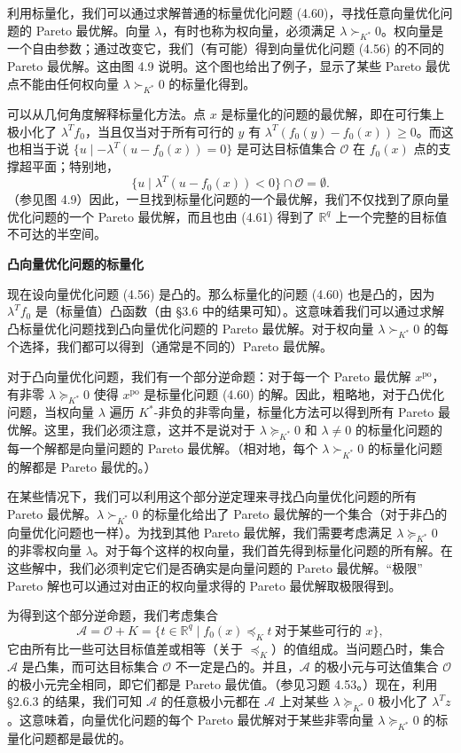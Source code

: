 \documentclass[UTF8,12pt,a4paper,fontset=fandol]{ctexart}
\begin{document}
利用标量化，我们可以通过求解普通的标量优化问题 (4.60)，寻找任意向量优化问题的 Pareto 最优解。向量 $\lambda$，有时也称为权向量，必须满足 $\lambda\succ_{K^\ast}0$。权向量是一个自由参数；通过改变它，我们（有可能）得到向量优化问题 (4.56) 的不同的 Pareto 最优解。这由图 4.9 说明。这个图也给出了例子，显示了某些 Pareto 最优点不能由任何权向量 $\lambda\succ_{K^\ast}0$ 的标量化得到。

可以从几何角度解释标量化方法。点 $x$ 是标量化的问题的最优解，即在可行集上极小化了 $\lambda^Tf_0$，当且仅当对于所有可行的 $y$ 有 $\lambda^T(f_0(y)-f_0(x))\geq 0$。而这也相当于说 $\{u\mid -\lambda^T(u-f_0(x))=0\}$ 是可达目标值集合 $\mathcal{O}$ 在 $f_0(x)$ 点的支撑超平面；特别地，
\begin{equation}
\{u\mid \lambda^T(u-f_0(x))<0\}\cap\mathcal{O}=\emptyset.
\tag{4.61}
\end{equation}
（参见图 4.9）因此，一旦找到标量化问题的一个最优解，我们不仅找到了原向量优化问题的一个 Pareto 最优解，而且也由 (4.61) 得到了 $\mathbb{R}^q$ 上一个完整的目标值不可达的半空间。

\noindent\textbf{凸向量优化问题的标量化}

现在设向量优化问题 (4.56) 是凸的。那么标量化的问题 (4.60) 也是凸的，因为 $\lambda^Tf_0$ 是（标量值）凸函数（由 \S 3.6 中的结果可知）。这意味着我们可以通过求解凸标量优化问题找到凸向量优化问题的 Pareto 最优解。对于权向量 $\lambda\succ_{K^\ast}0$ 的每个选择，我们都可以得到（通常是不同的）Pareto 最优解。

对于凸向量优化问题，我们有一个部分逆命题：对于每一个 Pareto 最优解 $x^{\mathrm{po}}$，有非零 $\lambda\succeq_{K^\ast}0$ 使得 $x^{\mathrm{po}}$ 是标量化问题 (4.60) 的解。因此，粗略地，对于凸优化问题，当权向量 $\lambda$ 遍历 $K^\ast$-非负的非零向量，标量化方法可以得到所有 Pareto 最优解。这里，我们必须注意，这并不是说对于 $\lambda\succeq_{K^\ast}0$ 和 $\lambda\neq 0$ 的标量化问题的每一个解都是向量问题的 Pareto 最优解。（相对地，每个 $\lambda\succ_{K^\ast}0$ 的标量化问题的解都是 Pareto 最优的。）

在某些情况下，我们可以利用这个部分逆定理来寻找凸向量优化问题的所有 Pareto 最优解。$\lambda\succ_{K^\ast}0$ 的标量化给出了 Pareto 最优解的一个集合（对于非凸的向量优化问题也一样）。为找到其他 Pareto 最优解，我们需要考虑满足 $\lambda\succeq_{K^\ast}0$ 的非零权向量 $\lambda$。对于每个这样的权向量，我们首先得到标量化问题的所有解。在这些解中，我们必须判定它们是否确实是向量问题的 Pareto 最优解。“极限” Pareto 解也可以通过对由正的权向量求得的 Pareto 最优解取极限得到。

为得到这个部分逆命题，我们考虑集合
\begin{equation}
\mathcal{A}=\mathcal{O}+K=\{t\in\mathbb{R}^q\mid f_0(x)\preceq_K t\ \text{对于某些可行的 }x\},
\tag{4.62}
\end{equation}
它由所有比一些可达目标值差或相等（关于 $\preceq_K$）的值组成。当问题凸时，集合 $\mathcal{A}$ 是凸集，而可达目标集合 $\mathcal{O}$ 不一定是凸的。并且，$\mathcal{A}$ 的极小元与可达值集合 $\mathcal{O}$ 的极小元完全相同，即它们都是 Pareto 最优值。（参见习题 4.53。）现在，利用 \S 2.6.3 的结果，我们可知 $\mathcal{A}$ 的任意极小元都在 $\mathcal{A}$ 上对某些 $\lambda\succeq_{K^\ast}0$ 极小化了 $\lambda^Tz$。这意味着，向量优化问题的每个 Pareto 最优解对于某些非零向量 $\lambda\succeq_{K^\ast}0$ 的标量化问题都是最优的。
\end{document}
